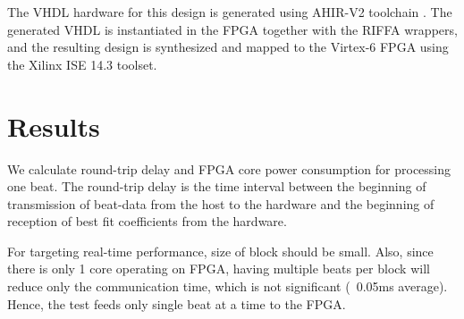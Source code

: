 \documentclass[runningheads]{llncs}
\begin{document}
The VHDL hardware for this design is generated using AHIR-V2 toolchain \cite{c:ahir_usenix2012}.  
The generated VHDL is instantiated in the FPGA together with the RIFFA wrappers,
and the resulting design is synthesized and mapped to the Virtex-6 FPGA using
the Xilinx ISE 14.3 toolset.


%
%
%
%
\section{Results}\label{s:results}

We calculate round-trip delay and FPGA core power consumption for processing one beat. 
The round-trip delay is the time interval between the beginning of transmission of 
beat-data from the host to the hardware and the beginning of reception of best fit
coefficients from the hardware. 

For targeting real-time performance, size of block should be small. Also, since there 
is only 1 core operating on FPGA, having multiple beats per block will reduce only the 
communication time, which is not significant (~0.05ms average). Hence, the test feeds 
only single beat at a time to the FPGA.
\end{document}
